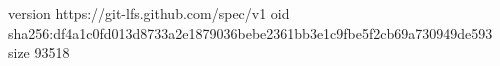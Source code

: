 version https://git-lfs.github.com/spec/v1
oid sha256:df4a1c0fd013d8733a2e1879036bebe2361bb3e1c9fbe5f2cb69a730949de593
size 93518
